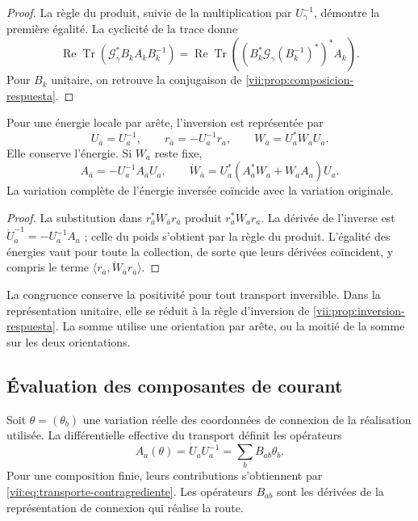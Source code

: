 \begin{proof}
La règle du produit, suivie de la multiplication par
\(U_\gamma^{-1}\), démontre la première égalité. La cyclicité
de la trace donne
\[
 \operatorname{Re}\operatorname{Tr}
  (\mathcal G_\gamma^*B_kA_kB_k^{-1})
 =\operatorname{Re}\operatorname{Tr}
  ((B_k^*\mathcal G_\gamma(B_k^{-1})^*)^*A_k).
\]
Pour \(B_k\) unitaire, on retrouve la conjugaison de
\ref{vii:prop:composicion-respuesta}.
\end{proof}

\begin{proposition}
\label{vii:prop:inversion-congruencia}
Pour une énergie locale par arête, l'inversion est représentée par
\begin{equation}
 U_{\bar a}=U_a^{-1},\qquad
 r_{\bar a}=-U_a^{-1}r_a,\qquad
 W_{\bar a}=U_a^*W_aU_a.
 \label{vii:eq:inversion-peso-general}
\end{equation}
Elle conserve l'énergie. Si \(W_a\) reste fixe,
\[
 A_{\bar a}=-U_a^{-1}A_aU_a,\qquad
 \dot W_{\bar a}=U_a^*(A_a^*W_a+W_aA_a)U_a.
\]
La variation complète de l'énergie inversée coïncide avec la variation originale.
\end{proposition}

\begin{proof}
La substitution dans \(r_{\bar a}^*W_{\bar a}r_{\bar a}\) produit \(r_a^*W_ar_a\). La dérivée de l'inverse est \(\dot U_a^{-1}=-U_a^{-1}A_a\) ; celle du poids s'obtient par la règle du produit. L'égalité des énergies vaut pour toute la collection, de sorte que leurs dérivées coïncident, y compris le terme \(\langle r_{\bar a},\dot W_{\bar a}r_{\bar a}\rangle\).
\end{proof}

La congruence conserve la positivité pour tout transport inversible.
Dans la représentation unitaire, elle se réduit à la règle d'inversion de
\ref{vii:prop:inversion-respuesta}. La somme utilise une orientation
par arête, ou la moitié de la somme sur les deux orientations.

\subsection{Évaluation des composantes de courant}

Soit \(\theta=(\theta_b)\) une variation réelle des coordonnées
de connexion de la réalisation utilisée. La différentielle effective du
transport définit les opérateurs
\begin{equation}
 A_a(\theta)=\dot U_aU_a^{-1}
     =\sum_bB_{ab}\theta_b.
 \label{vii:eq:diferencial-conexion-transporte}
\end{equation}
Pour une composition finie, leurs contributions s'obtiennent par
\eqref{vii:eq:transporte-contragrediente}. Les opérateurs
\(B_{ab}\) sont les dérivées de la représentation de connexion qui
réalise la route.

